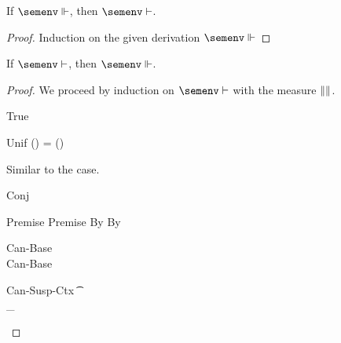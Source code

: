 \documentclass[acmsmall,screen,nonacm,review]{acmart}
\begin{document}
\begin{lemma}[Decanonicalization]
  \label{lem:decanonicalization}
  If $\semenv \Th \c$, then $\semenv \th \c$.
  \begin{proof}
    Induction on the given derivation $\semenv \Th \c$
  \end{proof}
\end{lemma}

\begin{theorem}[Canonicalization]
  \label{thm:canonicalization}
  If $\semenv \th \c$, then $\semenv \Th \c$.
  \begin{proof}
  We proceed by induction on $\semenv \th \c$ with the measure ${\| \relax \|}$.
  \begin{proofcases}
    \proofcasederivation
      {True}
      { }
      {\semenv \th \ctrue}

      \begin{llproof}
\Hand   {}
      \end{llproof}

    \proofcasederivation
      {Unif}
      {\semenv(\ta) = \semenv(\tb)}
      {\semenv \th \cunif \ta \tb}

      \begin{llproof}
	Similar to the  case.
      \end{llproof}
    \proofcasederivation
      {Conj}
      {\semenv \th \ca \\ \semenv \th \cb}
      {\semenv \th \ca \cand \cb}

      \begin{llproof}
	\vdashPf{\semenv}{\ca} {Premise}
	\vdashPf{\semenv}{\cb} {Premise}
	\VdashPf{\semenv}{\ca} {By \ih}
	\VdashPf{\semenv}{\cb} {By \ih}
	\decolumnizePf
	\casesPf{\semenv \Th \ca, \semenv \Th \cb}
      \end{llproof}

      \begin{proofcases}
	\proofcasederivationdouble
	  {Can-Base}
	  {\semenv \th \ca \\ \ca \simple}
	  {\semenv \Th \ca}
	  {Can-Base}
	  {\semenv \th \cb \\ \cb \simple}
	  {\semenv \Th \cb}

        \begin{llproof}
\Hand     {}
        \end{llproof}


	\proofcasederivationdouble
	  {Can-Susp-Ctx}
	  {\Cshape \C \t \sh \\ \semenv \Th \C\where{\cmatched \t \sh \cbrs}}
	  {\semenv \Th \underbrace{\C\where{\cmatch \t \cbrs}}_\ca}
	  {}
	  {}
	  {\semenv \Th \cb}


\end{proofcases}
\end{proofcases}
\end{proof}
\end{theorem}
\end{document}

